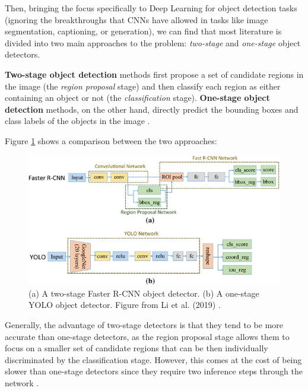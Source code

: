 \documentclass[../main.tex]{subfiles}
\begin{document}
    Then, bringing the focus specifically to Deep Learning for object detection tasks
    (ignoring the breakthroughs that CNNs have allowed in tasks like image segmentation, captioning, or generation), we can find that most literature is divided into two main approaches to the problem: \textit{two-stage} and \textit{one-stage} object detectors.
    
    \textbf{Two-stage object detection} methods first propose a set of candidate regions in the image (the \textit{region proposal} stage) and then classify each region as either containing an object or not (the \textit{classification} stage). \textbf{One-stage object detection} methods, on the other hand, directly predict the bounding boxes and class labels of the objects in the image \cite{zouObjectDetection202023b}. 
    
    Figure \ref{fig:fastrcnn_vs_yolo} shows a comparison between the two approaches:
    \clearpage
    
    \begin{figure}[h]
        \centering
        \includegraphics[width=0.9\linewidth]{figures/fastrcnn_vs_yolo}
        \caption{(a) A two-stage Faster R-CNN object detector. (b) A one-stage YOLO object detector. Figure from Li et al. (2019) \cite{liEnhancedBirdDetection2019}.
        }
        \label{fig:fastrcnn_vs_yolo}
    \end{figure}

    Generally, the advantage of two-stage detectors is that they tend to be more accurate than one-stage detectors, as the region proposal stage allows them to focus on a smaller set of candidate regions that can be then individually discriminated by the classification stage. However, this comes at the cost of being slower than one-stage detectors since they require two inference steps through the network \cite{zouObjectDetection202023b}.
\end{document}

